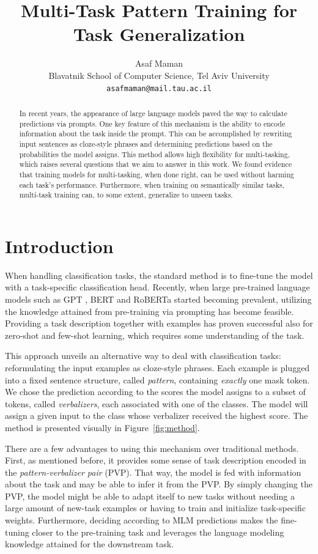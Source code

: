 \documentclass[11pt,a4paper]{article}
\title{Multi-Task Pattern Training for Task Generalization}
\author{Asaf Maman \\
  Blavatnik School of Computer Science, Tel Aviv University \\
  \texttt{asafmaman@mail.tau.ac.il} \\}
\date{}
\begin{document}
\maketitle

\begin{abstract}
In recent years, the appearance of large language models paved the way to calculate predictions via prompts.
One key feature of this mechanism is the ability to encode information about the task inside the prompt.
This can be accomplished by rewriting input sentences as cloze-style phrases and determining predictions based on the probabilities the model assigns.
This method allows high flexibility for multi-tasking, which raises several questions that we aim to answer in this work.
We found evidence that training models for multi-tasking, when done right, can be used without harming each task's performance.
Furthermore, when training on semantically similar tasks, multi-task training can, to some extent, generalize to unseen tasks.
\end{abstract}


\section{Introduction}
When handling classification tasks, the standard method is to fine-tune the model with a task-specific classification head.
Recently, when large pre-trained language models such as GPT \citep{radford2018improving}, BERT \citep{devlin2019bert} and RoBERTa \citep{liu2019roberta} started becoming prevalent, utilizing the knowledge attained from pre-training via prompting has become feasible.
Providing a task description together with examples has proven successful \citep{radford2019language} also for zero-shot and few-shot learning, which requires some understanding of the task.

This approach unveils an alternative way to deal with classification tasks: reformulating the input examples as cloze-style phrases.
Each example is plugged into a fixed sentence structure, called \textit{pattern}, containing \textit{exactly} one mask token.
We chose the prediction according to the scores the model assigns to a subset of tokens, called \textit{verbalizers}, each associated with one of the classes.
The model will assign a given input to the class whose verbalizer received the highest score.
The method is presented visually in Figure~\ref{fig:method}.

There are a few advantages to using this mechanism over traditional methods.
First, as mentioned before, it provides some sense of task description encoded in the \textit{pattern-verbalizer pair} (PVP).
That way, the model is fed with information about the task and may be able to infer it from the PVP.
By simply changing the PVP, the model might be able to adapt itself to new tasks without needing a large amount of new-task examples or having to train and initialize task-specific weights.
Furthermore, deciding according to MLM predictions makes the fine-tuning closer to the pre-training task and leverages the language modeling knowledge attained for the downstream task.\\
\end{document}
